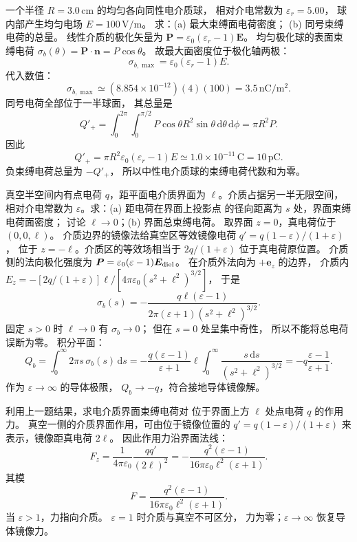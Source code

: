 一个半径
$R=3.0\,\mathrm{cm}$ 的均匀各向同性电介质球，
相对介电常数为
$\varepsilon_r=5.00$，
球内部产生均匀电场
$E=100\,\mathrm{V/m}$。
求：(a) 最大束缚面电荷密度；
(b) 同号束缚电荷的总量。
\exsolution
线性介质的极化矢量为
$\bm P=\varepsilon_0(\varepsilon_r-1)\bm E$。
均匀极化球的表面束缚电荷
$\sigma_b(\theta)=\bm P\cdot\bm n
=P\cos\theta$。
故最大面密度位于极化轴两极：
\[
\boxed{\sigma_{b,\max}=
\varepsilon_0(\varepsilon_r-1)E}.
\]
代入数值：
\[
\boxed{\sigma_{b,\max}\simeq
(8.854\times10^{-12})(4)(100)
=3.5\,\mathrm{nC/m^2}}.
\]
同号电荷全部位于一半球面，
其总量是
\[
Q'_+=\int_0^{2\pi}\int_0^{\pi/2}
P\cos\theta R^2\sin\theta
\,\mathrm d\theta\,\mathrm d\phi
=\pi R^2P.
\]
因此
\[
\boxed{Q'_+=\pi R^2
\varepsilon_0(\varepsilon_r-1)E
\simeq1.0\times10^{-11}\,\mathrm C
=10\,\mathrm{pC}}.
\]
\excheck 负束缚电荷总量为 $-Q'_+$，
所以中性电介质球的束缚电荷代数和为零。

真空半空间内有点电荷 $q$，距平面电介质界面为
$\ell$。介质占据另一半无限空间，相对介电常数为
$\varepsilon$。求：(a) 距电荷在界面上投影点
的径向距离为 $s$ 处，界面束缚电荷面密度；
讨论 $\ell\to0$；(b) 界面总束缚电荷。
\exsolution
取界面 $z=0$，真电荷位于 $(0,0,\ell)$。
介质边界的镜像法给真空区等效镜像电荷
$q'=q(1-\varepsilon)/(1+\varepsilon)$，
位于 $z=-\ell$。介质区的等效场相当于
$2q/(1+\varepsilon)$ 位于真电荷原位置。
介质侧的法向极化强度为
$\bm P=\varepsilon_0(\varepsilon-1)\bm E_{\rm diel}$。
在介质外法向为 $+\bm e_z$ 的边界，
介质内 $E_z=-[2q/(1+\varepsilon)]
\ell/[4\pi\varepsilon_0(s^2+\ell^2)^{3/2}]$，
于是
\[
\boxed{\sigma_b(s)=
-\frac{q\ell(\varepsilon-1)}
{2\pi(\varepsilon+1)(s^2+\ell^2)^{3/2}}}.
\]
固定 $s>0$ 时 $\ell\to0$ 有 $\sigma_b\to0$；
但在 $s=0$ 处呈集中奇性，
所以不能将总电荷误断为零。
积分平面：
\[
Q_b=\int_0^\infty2\pi s\,\sigma_b(s)\,\mathrm ds
=-\frac{q(\varepsilon-1)}{\varepsilon+1}
\ell\int_0^\infty\frac{s\,\mathrm ds}{(s^2+\ell^2)^{3/2}}
=\boxed{-q\frac{\varepsilon-1}{\varepsilon+1}}.
\]
\excheck 作为 $\varepsilon\to\infty$ 的导体极限，
$Q_b\to-q$，符合接地导体镜像解。

利用上一题结果，求电介质界面束缚电荷对
位于界面上方 $\ell$ 处点电荷 $q$ 的作用力。
\exsolution
真空一侧的介质界面作用，可由位于镜像位置的
$q'=q(1-\varepsilon)/(1+\varepsilon)$
来表示，镜像距真电荷 $2\ell$。
因此作用力沿界面法线：
\[
F_z=\frac1{4\pi\varepsilon_0}
\frac{q q'}{(2\ell)^2}
=-\frac{q^2(\varepsilon-1)}
{16\pi\varepsilon_0\ell^2(\varepsilon+1)}.
\]
其模
\[
\boxed{F=\frac{q^2(\varepsilon-1)}
{16\pi\varepsilon_0\ell^2(\varepsilon+1)}}.
\]
当 $\varepsilon>1$，力指向介质。
\excheck $\varepsilon=1$ 时介质与真空不可区分，
力为零；$\varepsilon\to\infty$ 恢复导体镜像力。

